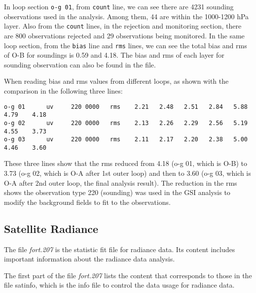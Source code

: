 In loop section \verb|o-g 01|, from \verb|count| line, we can see there are 4231 sounding observations used in the analysis. Among them, 44 are within the 1000-1200 hPa layer. Also from the \verb|count| lines, in the rejection and monitoring section, there are 800 observations rejected and 29 observations being monitored. In the same loop section, from the \verb|bias| line and \verb|rms| lines, we can see the total bias and rms of O-B for soundings is 0.59 and 4.18. The bias and rms of each layer for sounding observation can also be found in the file.

When reading bias and rms values from different loops, as shown with the comparison in the following three lines:

\begin{scriptsize}
\begin{verbatim}
o-g 01      uv     220 0000   rms    2.21   2.48   2.51   2.84   5.88   4.79    4.18
o-g 02      uv     220 0000   rms    2.13   2.26   2.29   2.56   5.19   4.55    3.73
o-g 03      uv     220 0000   rms    2.11   2.17   2.20   2.38   5.00   4.46    3.60
\end{verbatim}
\end{scriptsize}

These three lines show that the rms reduced from 4.18 (o-g 01, which is O-B) to 3.73 (o-g 02, which is O-A after 1st outer loop) and then to 3.60 (o-g 03, which is O-A after 2nd outer loop, the final analysis result). The reduction in the rms shows the observation type 220 (sounding) was used in the GSI analysis to modify the background fields to fit to the observations. 

\subsection{Satellite Radiance}
\label{sec4.5.2}

The file \textit{fort.207} is the statistic fit file for radiance data. Its content includes important information about the radiance data analysis.

The first part of the file \textit{fort.207} lists the content that corresponds to those in the file satinfo, which is the info file to control the data usage for radiance data. 

